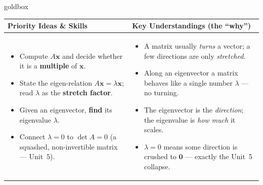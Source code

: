 \documentclass[10pt]{article}
\newcommand{\xx}{\mathbf{x}}
\newcommand{\zero}{\mathbf{0}}
\begin{document}
\renewcommand{\arraystretch}{1.4}
\begin{skillbox}{goldbox}
\begin{tabularx}{\linewidth}{@{}X|X@{}}
\textbf{Priority Ideas \& Skills} & \textbf{Key Understandings (the ``why'')} \\[2pt]
\hline
\vspace{-6pt}
\begin{itemize}[leftmargin=1.1em, nosep, after=\vspace{2pt}]
  \item Compute $A\xx$ and decide whether it is a \textbf{multiple} of $\xx$.
  \item State the eigen-relation $A\xx=\lambda\xx$; read $\lambda$ as the \textbf{stretch factor}.
  \item Given an eigenvector, \textbf{find} its eigenvalue $\lambda$.
  \item Connect $\lambda=0$ to $\det A=0$ (a squashed, non-invertible matrix --- Unit~5).
\end{itemize}
&
\vspace{-6pt}
\begin{itemize}[leftmargin=1.1em, nosep, after=\vspace{2pt}]
  \item A matrix usually \emph{turns} a vector; a few directions are only \emph{stretched}.
  \item Along an eigenvector a matrix behaves like a single number $\lambda$ --- no turning.
  \item The eigenvector is the \emph{direction}; the eigenvalue is \emph{how much} it scales.
  \item $\lambda=0$ means some direction is crushed to $\zero$ --- exactly the Unit~5 collapse.
\end{itemize}
\end{tabularx}
\end{skillbox}
\end{document}
